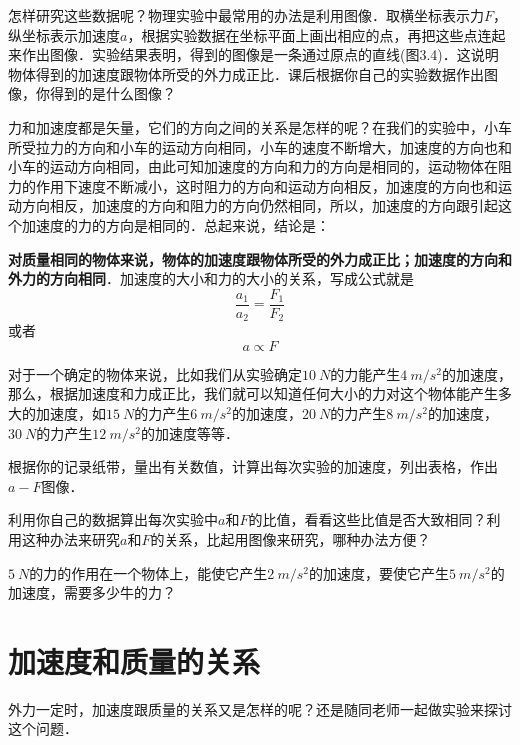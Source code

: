 \begin{Test}
怎样研究这些数据呢？物理实验中最常用的办法是利用图像．取横坐标表示力$F$，纵坐标表示加速度$a$，根据实验数据在坐标平面上画出相应的点，再把这些点连起来作出图像．实验结果表明，得到的图像是一条通过原点的直线(图3.4)．这说明物体得到的加速度跟物体所受的外力成正比．课后根据你自己的实验数据作出图像，你得到的是什么图像？

力和加速度都是矢量，它们的方向之间的关系是怎样的呢？在我们的实验中，小车所受拉力的方向和小车的运动方向相同，小车的速度不断增大，加速度的方向也和小车的运动方向相同，由此可知加速度的方向和力的方向是相同的，运动物体在阻力的作用下速度不断减小，这时阻力的方向和运动方向相反，加速度的方向也和运动方向相反，加速度的方向和阻力的方向仍然相同，所以，加速度的方向跟引起这个加速度的力的方向是相同的．总起来说，结论是：

\textbf{ 对质量相同的物体来说，物体的加速度跟物体所受的外力成正比；加速度的方向和外力的方向相同}．加速度的大小和力的大小的关系，写成公式就是
\[\frac{a_1}{a_2}=\frac{F_1}{F_2} \]
或者
\[a\propto F\]

对于一个确定的物体来说，比如我们从实验确定$\SI{10}{N}$的力能产生$\SI{4}{m/s^2}$的加速度，那么，根据加速度和力成正比，我们就可以知道任何大小的力对这个物体能产生多大的加速度，如$\SI{15}{N}$的力产生$\SI{6}{m/s^2}$的加速度，$\SI{20}{N}$的力产生$\SI{8}{m/s^2}$的加速度，$\SI{30}{N}$的力产生$\SI{12}{m/s^2}$的加速度等等．



\begin{Exercise}
	\begin{QsNum}
		\item 根据你的记录纸带，量出有关数值，计算出每次实验的加速度，列出表格，作出$a-F$图像．
		\item 利用你自己的数据算出每次实验中$a$和$F$的比值，看看这些比值是否大致相同？利用这种办法来研究$a$和$F$的关系，比起用图像来研究，哪种办法方便？
		\item $\SI{5}{N}$的力的作用在一个物体上，能使它产生$\SI{2}{m/s^2}$的加速度，要使它产生$\SI{5}{m/s^2}$的加速度，需要多少牛的力？
	\end{QsNum}
\end{Exercise}







\section{加速度和质量的关系}
外力一定时，加速度跟质量的关系又是怎样的呢？还是随同老师一起做实验来探讨这个问题．


\end{Test}
